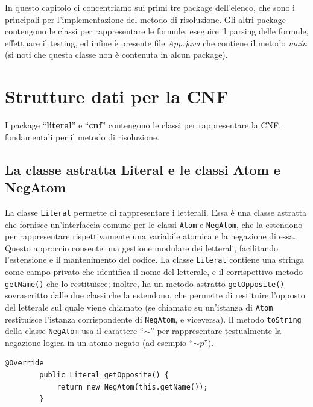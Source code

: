 \documentclass[a4paper,12pt]{report}
\begin{document}
In questo capitolo ci concentriamo sui primi tre package dell'elenco, che sono i principali per l'implementazione del metodo di risoluzione. Gli altri package contengono le classi per rappresentare le formule, eseguire il parsing delle formule, effettuare il testing, ed infine è presente file \emph{App.java} che contiene il metodo \emph{main} (si noti che questa classe non è contenuta in alcun package).


\section{Strutture dati per la CNF}
I package ``\textbf{literal}'' e ``\textbf{cnf}'' contengono le classi per rappresentare la CNF, fondamentali per il metodo di risoluzione.

\subsection{La classe astratta Literal e le classi Atom e NegAtom}
\label{literal}
La classe \texttt{Literal} permette di rappresentare i letterali. Essa è una classe astratta che fornisce un'interfaccia comune per le classi \texttt{Atom} e \texttt{NegAtom}, che la estendono per rappresentare rispettivamente una variabile atomica e la negazione di essa. Questo approccio consente una gestione modulare dei letterali, facilitando l'estensione e il mantenimento del codice. La classe \texttt{Literal} contiene una stringa come campo privato che identifica il nome del letterale, e il corrispettivo metodo \texttt{getName()} che lo restituisce; inoltre, ha un metodo astratto \texttt{getOpposite()} sovrascritto dalle due classi che la estendono, che permette di restituire l'opposto del letterale sul quale viene chiamato (se chiamato su un'istanza di \texttt{Atom} restituisce l'istanza corrispondente di \texttt{NegAtom}, e viceversa). Il metodo \texttt{toString} della classe \texttt{NegAtom} usa il carattere ``\textbf{$\sim $}'' per rappresentare testualmente la negazione logica in un atomo negato (ad esempio ``\emph{$\sim p$}'').

\begin{minipage}{\linewidth}
    \begin{lstlisting}[title={metodo getOpposite sovrascritto dalla classe Atom}]
        @Override
        public Literal getOpposite() {
            return new NegAtom(this.getName());
        }
    \end{lstlisting}
\end{minipage}
\end{document}
